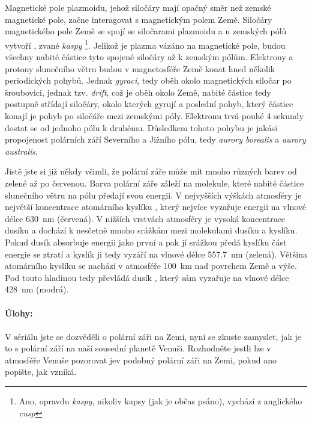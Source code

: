\documentclass{../../../../style/mkimain}
\begin{document}
Magnetické pole plazmoidu, jehož siločáry mají opačný směr než zemské magnetické pole, začne 
interagovat s magnetickým polem Země. Siločáry magnetického pole Země se spojí se siločarami plazmoidu 
a u zemských pólů vytvoří , zvané \emph{kaspy} \footnote[2]{Ano, opravdu \emph{kaspy}, 
nikoliv kapsy (jak je občas psáno), vychází z anglického \emph{cusp}}. Jelikož je plazma vázáno na magnetické pole, 
budou všechny nabité částice  tyto spojené siločáry až k zemským pólům. Elektrony 
a protony slunečního větru budou v magnetosféře Země konat hned několik periodických pohybů.
Jednak \emph{gyraci}, tedy oběh okolo magnetických siločar po šroubovici, jednak tzv. \emph{drift}, 
což je oběh okolo Země, nabité částice tedy postupně střídají siločáry, okolo kterých gyrují a 
poslední pohyb, který částice konají je pohyb po siločáře mezi zemskými póly. Elektronu trvá 
pouhé 4 sekundy dostat se od jednoho pólu k druhému. Důsledkem tohoto pohybu je jakási 
propojenost polárních září Severního a Jižního pólu, tedy \emph{aurory borealis} a \emph{aurory australis}.

Jistě jste si již někdy všimli, že polární záře může mít mnoho různých barev od zelené až 
po červenou. Barva polární záře záleží na molekule, které nabité částice slunečního větru 
na pólu předají svou energii. V nejvyšších výškách atmosféry je největší koncentrace atomárního 
kyslíku , který nejvíce vyzařuje energii na vlnové délce \qty{630}{\nm} (červená). V nižších 
vrstvách atmosféry je vysoká koncentrace dusíku  a dochází k nesčetně mnoho srážkám mezi 
molekulami dusíku a kyslíku. Pokud dusík absorbuje energii jako první a pak jí srážkou předá 
kyslíku část energie se ztratí a kyslík ji tedy vyzáří na vlnové délce \qty{557.7}{\nm} (zelená).
Většina atomárního kyslíku se nachází v atmosféře \qty{100}{\km} nad povrchem Země a výše. Pod 
touto hladinou tedy převládá dusík , který sám vyzařuje na vlnové délce \qty{428}{\nm} (modrá).
\\
\\
\textbf{Úlohy:}
\\
\\
V sériálu jste se dozvěděli o polární záři na Zemi, nyní se zkuste zamyslet, jak je to s polární září na naší 
sousední planetě Venuši. Rozhodněte jestli lze v atmosféře Venuše pozorovat jev podobný polární záři na Zemi, pokud ano popište, jak vzniká.
\end{document}
